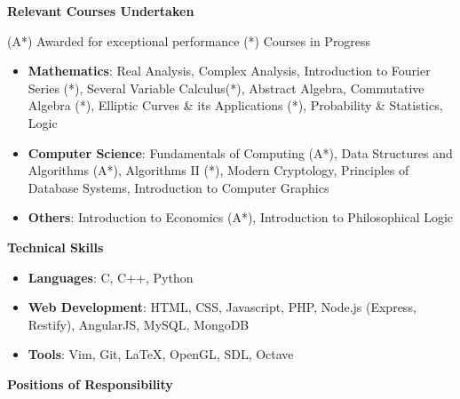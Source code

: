 \documentclass[letterpaper,11pt]{article}
\begin{document}
{\vspace{-1pt}
\Large{\textbf{Relevant Courses Undertaken}}
\footnotesize{\hfill(A*) Awarded for exceptional performance \hspace{0.25in}  (*) Courses in Progress\\
\small
\vspace{-2pt}
\begin{itemize}
    \item \textbf{Mathematics}:
        Real Analysis, Complex Analysis, Introduction to Fourier Series (*), Several Variable Calculus(*),
        Abstract Algebra, Commutative Algebra (*), Elliptic Curves \& its Applications (*),
        Probability \& Statistics, Logic\\
    \vspace{-2pt}
    \item \textbf{Computer Science}: Fundamentals of Computing (A*), Data Structures and Algorithms (A*), Algorithms II (*), Modern Cryptology, Principles of Database Systems, Introduction to Computer Graphics\\
    \vspace{-2pt}
    \item \textbf{Others}: Introduction to Economics (A*), Introduction to Philosophical Logic\\
    \vspace{-2pt}
\end{itemize}

\vspace{4pt}
\Large{\textbf{Technical Skills}}
\small
\vspace{-2pt}
\begin{itemize}
    \item \textbf{Languages}: C, C++, Python
    \vspace{-2pt}
    \item \textbf{Web Development}: HTML, CSS, Javascript, PHP, Node.js (Express, Restify), AngularJS, MySQL, MongoDB
    \vspace{-2pt}
    \item \textbf{Tools}: Vim, Git, \LaTeX, OpenGL, SDL, Octave
    \vspace{-2pt}
\end{itemize}

\vspace{4pt}
\Large{\textbf{Positions of Responsibility}}
\small
\vspace{-5pt}

}}
\end{document}
